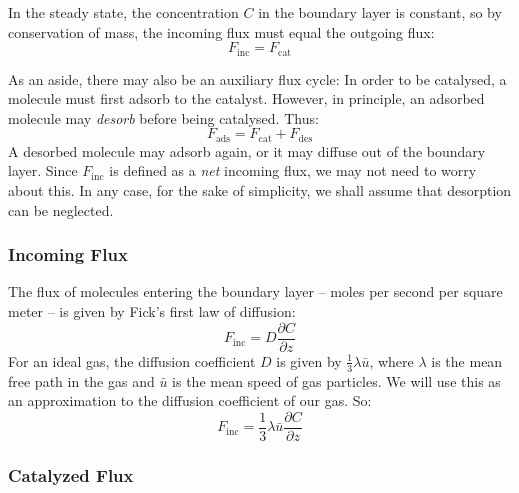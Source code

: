 \documentclass[12pt, a4paper, twoside, openright]{book}
\newcommand{\Finc}{\ensuremath{F_{\mathrm{inc}}}}
\newcommand{\Fads}{\ensuremath{F_{\mathrm{ads}}}}
\newcommand{\Fdes}{\ensuremath{F_{\mathrm{des}}}}
\newcommand{\Fcat}{\ensuremath{F_{\mathrm{cat}}}}
\begin{document}
In the steady state, the concentration $C$ in the boundary layer is constant, so by conservation of mass, the incoming flux must equal the outgoing flux:
\begin{equation}
\Finc = \Fcat
\end{equation}

As an aside, there may also be an auxiliary flux cycle:
In order to be catalysed, a molecule must first adsorb to the catalyst.  However, in principle, an adsorbed molecule may \emph{desorb} before being catalysed.  Thus:
\begin{equation}
\Fads = \Fcat + \Fdes
\end{equation}
A desorbed molecule may adsorb again, or it may diffuse out of the boundary layer.  Since $\Finc$ is defined as a \emph{net} incoming flux,
we may not need to worry about this.  In any case, for the sake of simplicity, we shall assume that desorption can be neglected.

\subsubsection{Incoming Flux}

The flux of molecules entering the boundary layer -- moles per second per square meter -- is given by Fick's first law of diffusion:
\begin{equation}
\Finc = D \frac{\partial C}{\partial z}
\end{equation}
For an ideal gas, the diffusion coefficient $D$ is given by $\frac{1}{3} \lambda \bar{u}$, where $\lambda$ is the mean free path in the gas and $\bar{u}$ is the mean speed of gas particles.  We will use this as an approximation to the diffusion coefficient of our gas. So:
\begin{equation}
\Finc = \frac{1}{3} \lambda \bar{u} \frac{\partial C}{\partial z}
\end{equation}


\subsubsection{Catalyzed Flux}
\end{document}
